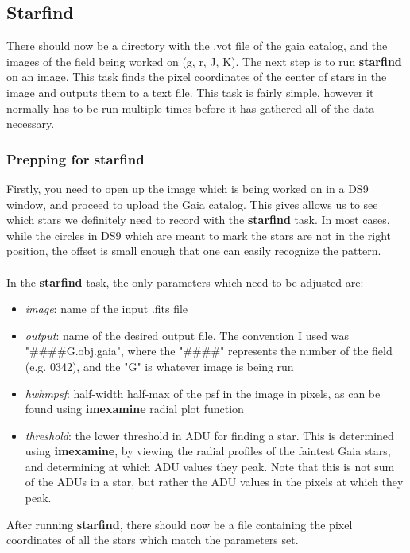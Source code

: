 \documentclass[a4paper]{article}
\begin{document}
\subsection{Starfind}
There should now be a directory with the .vot file of the gaia catalog, and the images of the field being worked on (g, r, J, K).  The next step is to run \textbf{starfind} on an image.  This task finds the pixel coordinates of the center of stars in the image and outputs them to a text file.  This task is fairly simple, however it normally has to be run multiple times before it has gathered all of the data necessary.
\subsubsection{Prepping for starfind}
Firstly, you need to open up the image which is being worked on in a DS9 window, and proceed to upload the Gaia catalog.  This gives allows us to see which stars we definitely need to record with the \textbf{starfind} task.  In most cases, while the circles in DS9 which are meant to mark the stars are not in the right position, the offset is small enough that one can easily recognize the pattern. \\ \\
In the \textbf{starfind} task, the only parameters which need to be adjusted are:
\begin{itemize}
    \item \textit{image}: name of the input .fits file 
    \item \textit{output}: name of the desired output file.  The convention I used was "\#\#\#\#G.obj.gaia", where the "\#\#\#\#" represents the number of the field (e.g. 0342), and the "G" is whatever image is being run
    \item \textit{hwhmpsf}: half-width half-max of the psf in the image in pixels, as can be found using \textbf{imexamine} radial plot function
    \item \textit{threshold}: the lower threshold in ADU for finding a star.  This is determined using \textbf{imexamine}, by viewing the radial profiles of the faintest Gaia stars, and determining at which ADU values they peak.  Note that this is not sum of the ADUs in a star, but rather the ADU values in the pixels at which they peak.
\end{itemize}
After running \textbf{starfind}, there should now be a file containing the pixel coordinates of all the stars which match the parameters set.
\end{document}
